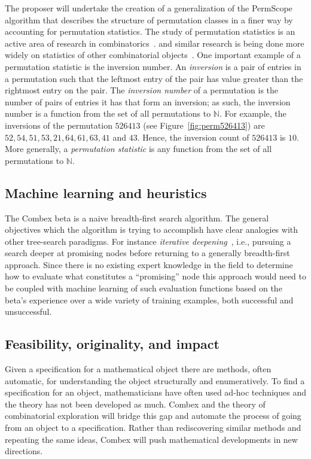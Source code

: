 \documentclass{rannis}
\newcommand{\motheralg}{\textsf{Combex}}
\newcommand{\tilealg}{\textsf{PermScope}}
\theoremstyle{definition}
\begin{document}
The proposer will undertake the creation
of a generalization of the \tilealg{} algorithm that describes the structure of permutation
classes in a finer way by accounting for permutation statistics.
The study of permutation statistics is an active area of research in
combinatorics~\cite{bukata2019statisitics, dokos2012statistics,
babson2000vincular,branden2011meshpattern}.
and similar research is being done more widely on
statistics of other combinatorial objects~\cite{findstat, MR4011551, MR4109929}.
One important example of a
permutation statistic is the inversion number. An \emph{inversion} is a pair of
entries in a permutation such that the leftmost entry of the pair has value
greater than the rightmost entry on the pair. The \emph{inversion number} of a
permutation is the number of pairs of entries it has that form an inversion;
as such, the
inversion number is a function from the set of all permutations to $\mathbb{N}$.
For example, the inversions of the permutation $526413$
(see Figure~\ref{fig:perm526413}) are $52, 54,51,53,21,64,61,63,41$ and $43$.
Hence, the inversion count of $526413$ is $10$.
More generally, a \emph{permutation statistic} is any function from the set of
all permutations to $\mathbb{N}$.


\subsection*{Machine learning and heuristics}
The \motheralg{} beta is a naive breadth-first search algorithm. The
general objectives which the algorithm is trying to accomplish have clear
analogies with other tree-search paradigms. For instance
\emph{iterative deepening}~\cite{KORF198597,russell2002artificial},
i.e., pursuing a search deeper at promising nodes
before returning to a generally breadth-first approach. Since there is no
existing expert knowledge in the field to determine how to evaluate what
constitutes a ``promising'' node this approach would need to be coupled with
machine learning of such evaluation functions based on the beta's
experience over a wide variety of training examples, both successful and
unsuccessful.

\subsection*{Feasibility, originality, and impact}
Given a
specification for a mathematical object there are methods, often automatic, for
understanding the object structurally and enumeratively.
To find a
specification for an object, mathematicians have often
used ad-hoc techniques and the theory has not been developed as much.
\motheralg{} and the theory of combinatorial exploration will bridge this gap
and automate the process of going from an object to a
specification. Rather than rediscovering similar methods and repeating the same
ideas, \motheralg{} will push mathematical developments in new directions.
\end{document}
